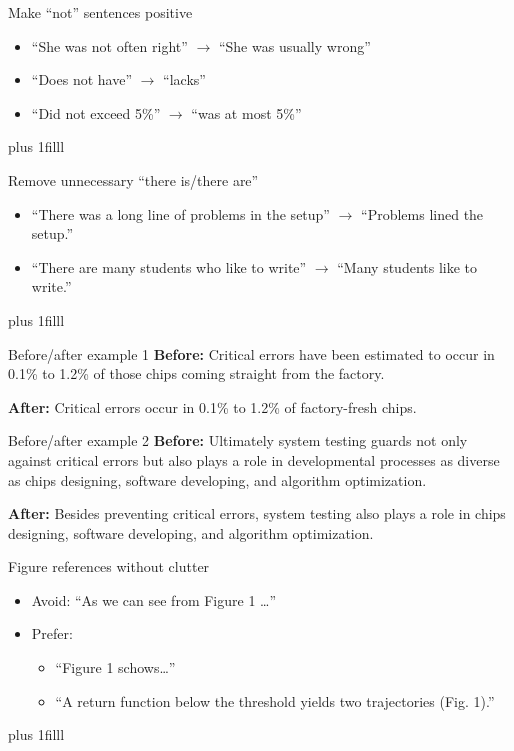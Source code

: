 \documentclass[aspectratio=169]{beamer}
\newcommand{\btVFill}{\vskip0pt plus 1filll}
\begin{document}
\begin{frame}{Make ``not'' sentences positive}
  \begin{itemize}
    \item ``She was not often right'' $\rightarrow$ ``She was usually wrong''
    \item ``Does not have'' $\rightarrow$ ``lacks''
    \item ``Did not exceed 5\%'' $\rightarrow$ ``was at most 5\%''
  \end{itemize}
\btVFill
\end{frame}

\begin{frame}{Remove unnecessary ``there is/there are''}
  \begin{itemize}
    \item ``There was a long line of problems in the setup'' $\rightarrow$ ``Problems lined the setup.''
    \item ``There are many students who like to write'' $\rightarrow$ ``Many students like to write.''
  \end{itemize}
\btVFill
\end{frame}

\begin{frame}{Before/after example 1}
  \textbf{Before:} Critical errors have been estimated to occur in 0.1\% to 1.2\% of those chips coming straight from the factory.

  \vspace{0.6em}
  \textbf{After:} Critical errors occur in 0.1\% to 1.2\% of factory-fresh chips.
\end{frame}

\begin{frame}{Before/after example 2}
  \textbf{Before:} Ultimately system testing guards not only against critical errors but also plays a role in developmental processes as diverse as chips designing, software developing, and algorithm optimization.

  \vspace{0.6em}
  \textbf{After:} Besides preventing critical errors, system testing also plays a role in chips designing, software developing, and algorithm optimization.
\end{frame}


\begin{frame}{Figure references without clutter}
  \begin{itemize}
    \item Avoid: ``As we can see from Figure 1 \ldots''
    \item Prefer:
      \begin{itemize}
        \item ``Figure 1 schows\ldots''
        \item ``A return function below the threshold yields two trajectories (Fig. 1).''
      \end{itemize}
  \end{itemize}
\btVFill
\end{frame}
\end{document}
